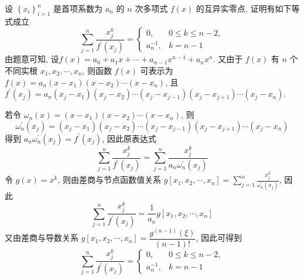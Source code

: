  \begin{tcolorbox}[enhanced,colback=10,colframe=9,breakable,coltitle=green!25!black,title=2024]
 设 $ \left\{x_{i}\right\}_{i=1}^{n} $ 是首项系数为 $ a_{n} $ 的 $ n $ 次多项式 $ f(x) $ 的互异实零点, 证明有如下等式成立
$$
\sum_{j=1}^{n} \frac{x_{j}^{k}}{f^{\prime}\left(x_{j}\right)}=\left\{\begin{array}{ll}
0, & 0 \leqslant k \leqslant n-2, \\
a_{n}^{-1}, & k=n-1
\end{array}\right.
$$
\tcblower
 由题意可知, 设$f(x)=a_{0}+a_{1} x+\cdots+a_{n-1} x^{n-1}+a_{n} x^{n}$.
又由于 $ f(x) $ 有 $ n $ 个不同实根 $ x_{1}, x_{2}, \cdots, x_{n} $, 则函数 $ f(x) $ 可表示为$f(x)=a_{n}\left(x-x_{1}\right)\left(x-x_{2}\right) \cdots\left(x-x_{n}\right)$, 且 $ f^{\prime}\left(x_{j}\right)=a_{n}\left(x_{j}-x_{1}\right)\left(x_{j}-x_{2}\right) \cdots\left(x_{j}-x_{j-1}\right)\left(x_{j}-x_{j+1}\right) \cdots\left(x_{j}-x_{n}\right) $.

若令 $ \omega_{n}(x)=\left(x-x_{1}\right)\left(x-x_{2}\right) \cdots\left(x-x_{n}\right) $, 则
$$
\omega_{n}^{\prime}\left(x_{j}\right)=\left(x_{j}-x_{1}\right)\left(x_{j}-x_{2}\right) \cdots\left(x_{j}-x_{j-1}\right)\left(x_{j}-x_{j+1}\right) \cdots\left(x_{j}-x_{n}\right)
$$
得到 $ a_{n} \omega_{n}^{\prime}\left(x_{j}\right)=f^{\prime}\left(x_{j}\right) $, 因此原表达式
$$
\sum_{j=1}^{n} \frac{x_{j}^{k}}{f^{\prime}\left(x_{j}\right)}=\sum_{j=1}^{n} \frac{x_{j}^{k}}{a_{n} \omega_{n}^{\prime}\left(x_{j}\right)}
$$
令 $ g(x)=x^{k} $, 则由差商与节点函数值关系 $\displaystyle g\left[x_{1}, x_{2}, \cdots, x_{n}\right]=\sum_{j=1}^{n} \frac{x_{j}^{k}}{\omega_{n}^{\prime}\left(x_{j}\right)} $, 因此
$$
\sum_{j=1}^{n} \frac{x_{j}^{k}}{f^{\prime}\left(x_{j}\right)}=\frac{1}{a_{n}} g\left[x_{1}, x_{2}, \cdots, x_{n}\right]
$$
又由差商与导数关系 $ g\left[x_{1}, x_{2}, \cdots, x_{n}\right]=\dfrac{g^{(n-1)}(\xi)}{(n-1)!} $, 因此可得到
$$
\sum_{j=1}^{n} \frac{x_{j}^{k}}{f^{\prime}\left(x_{j}\right)}=\left\{\begin{array}{ll}
0, & 0 \leqslant k \leqslant n-2, \\
a_{n}^{-1}, & k=n-1
\end{array}\right.
$$

\end{tcolorbox}

